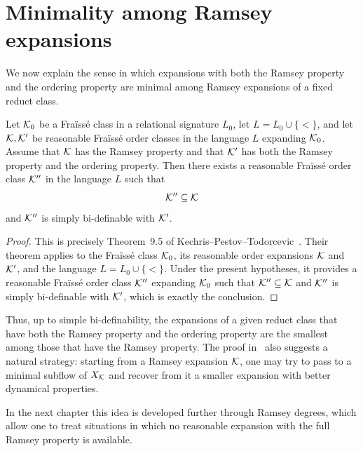 \section{Minimality among Ramsey expansions}

We now explain the sense in which expansions with both the Ramsey property and the ordering property are minimal among Ramsey expansions of a fixed reduct class.

\begin{theorem}
    \label{thm:minimality-among-ramsey-expansions}
    Let \(\mathcal{K}_0\) be a Fraïssé class in a relational signature \(L_0\), let
    \(L=L_0\cup\{<\}\),
    and let \(\mathcal{K},\mathcal{K}'\) be reasonable Fraïssé order classes in the language \(L\) expanding \(\mathcal{K}_0\). Assume that \(\mathcal{K}\) has the Ramsey property and that \(\mathcal{K}'\) has both the Ramsey property and the ordering property. Then there exists a reasonable Fraïssé order class \(\mathcal{K}''\) in the language \(L\) such that
    \[
        \mathcal{K}''\subseteq \mathcal{K}
    \]
    and \(\mathcal{K}''\) is simply bi-definable with \(\mathcal{K}'\).
\end{theorem}

\begin{proof}
    This is precisely Theorem~9.5 of
    Kechris--Pestov--Todorcevic~\cite{KPT05}. Their theorem applies to the
    Fraïssé class \(\mathcal{K}_0\), its reasonable order expansions \(\mathcal{K}\) and
    \(\mathcal{K}'\), and the language \(L=L_0\cup\{<\}\). Under the present
    hypotheses, it provides a reasonable Fraïssé order class \(\mathcal{K}''\)
    expanding \(\mathcal{K}_0\) such that \(\mathcal{K}''\subseteq\mathcal{K}\) and \(\mathcal{K}''\) is
    simply bi-definable with \(\mathcal{K}'\), which is exactly the conclusion.
\end{proof}

Thus, up to simple bi-definability, the expansions of a given reduct class that have both the Ramsey property and the ordering property are the smallest among those that have the Ramsey property. The proof in~\cite{KPT05} also suggests a natural strategy: starting from a Ramsey expansion \(\mathcal{K}\), one may try to pass to a minimal subflow of \(X_{\mathcal{K}}\) and recover from it a smaller expansion with better dynamical properties.

In the next chapter this idea is developed further through Ramsey degrees, which allow one to treat situations in which no reasonable expansion with the full Ramsey property is available.
